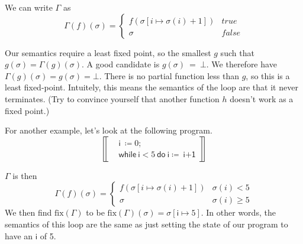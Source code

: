 \documentclass{lecturenotes}
\newcommand{\imp}[1]{\textsf{#1}}
\begin{document}
We can write $\Gamma$ as
\[
  \Gamma(f)(\sigma) = \begin{cases}
    f(\sigma[i \mapsto \sigma(i) + 1]) & true \\
    \sigma & false
  \end{cases}
\]

\noindent Our semantics require a least fixed point, so the smallest $g$ such that $g(\sigma) = \Gamma(g)(\sigma)$.
A good candidate is $g(\sigma)~=~\bot$.
We therefore have $\Gamma(g)(\sigma) = g(\sigma) = \bot$.
There is no partial function less than $g$, so this is a least fixed-point.
Intuitely, this means the semantics of the loop are that it never terminates.
(Try to convince yourself that another function $h$ doesn't work as a fixed point.)

For another example, let's look at the following program.
\[
  \left\llbracket
  \begin{aligned}
    & \imp{i}~\coloneq 0;\\
    & \imp{while}~\imp{i}<5~\imp{do}~\imp{i}\coloneq~\imp{i+1}
  \end{aligned}
  \right\rrbracket
\]

$\Gamma$ is then
\[
  \Gamma(f)(\sigma) = \begin{cases}
    f(\sigma[i \mapsto \sigma(i) + 1]) & \sigma(i) < 5 \\
    \sigma & \sigma(i) \ge 5
  \end{cases}
\]
We then find $\text{fix}(\Gamma)$ to be $\text{fix}(\Gamma)(\sigma) = \sigma[\imp{i} \mapsto 5]$.
In other words, the semantics of this loop are the same as just setting the state of our program to have an $\imp{i}$ of 5.
\end{document}
